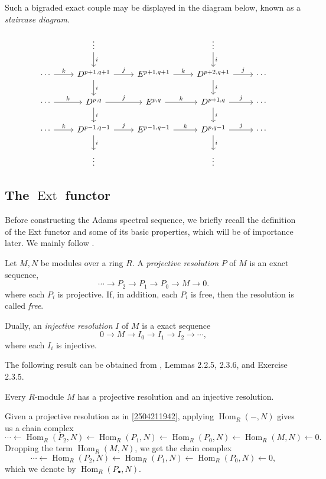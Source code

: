 \documentclass{MetricNotes2023}
\DeclareMathOperator{\Ext}{Ext}
\DeclareMathOperator{\Hom}{Hom}
\begin{document}
Such a bigraded exact couple may be displayed in the diagram below, known as a \textit{staircase diagram}.

\[\begin{tikzcd} 
   &  \vdots \arrow[d, "i"] &  & \vdots \arrow[d, "i"] & \\
 \cdots \arrow[r, "k"] & D^{p+1, q+1} \arrow[d, "i"] \arrow[r, "j"] & E^{p+1,q+1}  \arrow[r, "k"] & D^{p+2,q+1} \arrow[d, "i"] \arrow[r, "j"] & \cdots \\
 \cdots \arrow[r, "k"] & D^{p,q} \arrow[d, "i"] \arrow[r, "j"] & E^{p,q}  \arrow[r, "k"] & D^{p+1,q} \arrow[d, "i"] \arrow[r, "j"] & \cdots \\
 \cdots \arrow[r, "k"] & D^{p-1,q-1}  \arrow[d, "i"] \arrow[r, "j"] & E^{p-1,q-1}  \arrow[r, "k"] & D^{p,q-1} \arrow[d, "i"] \arrow[r, "j"] & \cdots \\
 & \vdots &  & \vdots & 
\end{tikzcd}\]

\subsection{The \(\Ext\) functor}\label{2504291247}
Before constructing the Adams spectral sequence, we briefly recall the definition of the Ext functor and some of its basic properties, which will be of importance later. We mainly follow \autocite{weibel}.

\begin{definition}\label{2504211942}
Let \(M, N\) be modules over a ring \(R\). A \textit{projective resolution} \(P\) of \(M\) is an exact sequence,
\[\cdots \to P_2 \to P_1 \to P_0 \to M \to 0.\]
where each \(P_i\) is projective. If, in addition, each \(P_i\) is free, then the resolution is called \textit{free}. 

Dually, an \textit{injective resolution} \(I\) of \(M\) is a exact sequence
\[0 \to M \to I_0 \to I_1 \to I_2 \to \cdots,\]
where each \(I_i\) is injective.
\end{definition}

The following result can be obtained from \autocite{weibel}, Lemmas 2.2.5, 2.3.6, and Exercise 2.3.5. 

\begin{lemma}
Every \(R\)-module \(M\) has a projective resolution and an injective resolution. 
\end{lemma}

Given a projective resolution as in \ref{2504211942}, applying \(\Hom_R(-, N)\) gives us a chain complex
\[\cdots \leftarrow \Hom_R(P_2, N) \leftarrow \Hom_R(P_1, N) \leftarrow \Hom_R(P_0, N) \leftarrow \Hom_R(M, N) \leftarrow 0.\]
Dropping the term \(\Hom_R(M, N)\), we get the chain complex
\[\cdots \leftarrow \Hom_R(P_2, N) \leftarrow \Hom_R(P_1, N) \leftarrow \Hom_R(P_0, N) \leftarrow 0,\]
which we denote by \(\Hom_R(P_\bullet, N)\). 
\end{document}

